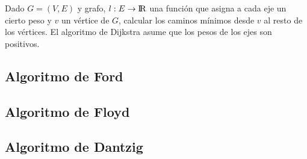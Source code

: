 Dado $G = (V, E)$ y grafo, $l: E \rightarrow {\rm I\!R}$ una funci\'on que asigna a cada eje un cierto peso y $v$ un v\'ertice de $G$, calcular los caminos m\'inimos desde $v$ al resto de los v\'ertices. El algoritmo de Dijkstra asume que los pesos de los ejes son positivos.


\newpage
\subsection{Algoritmo de Ford}
\newpage
\subsection{Algoritmo de Floyd}
\newpage
\subsection{Algoritmo de Dantzig}